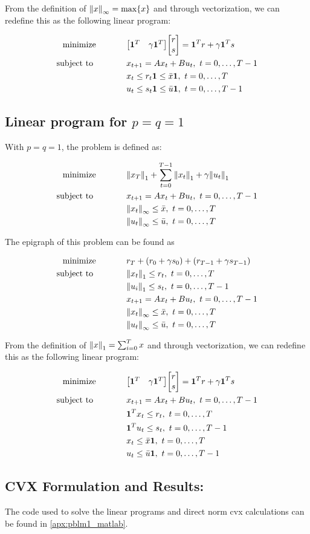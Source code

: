 \documentclass[letter]{article}
\newcommand{\optpblm}[3][eq:default]{
	\begin{equation}\label{#1}
		\begin{aligned}
			\text{minimize} \hspace{0.5in} &#2\vspace{5pt}\\
			\text{subject to \hspace{0.5in}} &#3
		\end{aligned}	
	\end{equation}
}
\begin{document}
From the definition of $\norm{x}_\infty = \max \{x\}$ and through vectorization, we can redefine this as the following linear program:
\optpblm{
	\mqty[\vb{1}^T & \gamma \vb{1}^T] \mqty[r\\s] 
	=\vb{1}^T r + \gamma \vb{1}^T s}{
	x_{t+1} = A x_t + B u_t, \ t = 0,\dots,T-1\\
	&x_t \leq r_t \vb{1} \leq \bar{x} \vb{1}, \ t = 0, \dots, T\\
	&u_t \leq s_t \vb{1} \leq \bar{u} \vb{1}, \ t = 0, \dots, T-1
	}

\subsection{Linear program for $p = q = 1$}
With $p = q = 1$, the problem is defined as:
\optpblm{\norm{x_T}_1 + \sum_{t = 0}^{T-1} \norm{x_t}_1 + \gamma\norm{u_t}_1}{
	x_{t+1} = A x_t + B u_t, \ t = 0,\dots,T-1\\
	& \norm{x_t}_\infty \leq \bar{x}, \ t = 0,\dots,T\\
	& \norm{u_t}_\infty \leq \bar{u}, \ t = 0,\dots,T}

The epigraph of this problem can be found as
\optpblm{r_T + (r_0 + \gamma s_0) + (r_{T-1} + \gamma s_{T-1})}{
	\norm{x_t}_1 \leq r_t, \ t = 0, \dots, T\\
	&\norm{u_i}_1 \leq s_t, \ t = 0, \dots, T-1\\
	&x_{t+1} = A x_t + B u_t, \ t = 0,\dots,T-1\\
	& \norm{x_t}_\infty \leq \bar{x}, \ t = 0,\dots,T\\
	& \norm{u_t}_\infty \leq \bar{u}, \ t = 0,\dots,T
}

From the definition of $\norm{x}_1 = \sum_{i=0}^T x$ and through vectorization, we can redefine this as the following linear program:
\optpblm{
	\mqty[\vb{1}^T & \gamma \vb{1}^T] \mqty[r\\s] 
	=\vb{1}^T r + \gamma \vb{1}^T s}{
	x_{t+1} = A x_t + B u_t, \ t = 0,\dots,T-1\\
	& \vb{1}^T x_t \leq r_t, \ t = 0,\dots,T\\
	& \vb{1}^T u_t \leq s_t, \ t = 0,\dots,T-1\\
	&x_t \leq \bar{x} \vb{1}, \ t = 0, \dots, T\\
	&u_t \leq \bar{u} \vb{1}, \ t = 0, \dots, T-1
}


\newpage
\subsection{CVX Formulation and Results:}
The code used to solve the linear programs and direct norm cvx calculations can be found in \appendixname \ref{apx:pblm1_matlab}.\\
\end{document}

